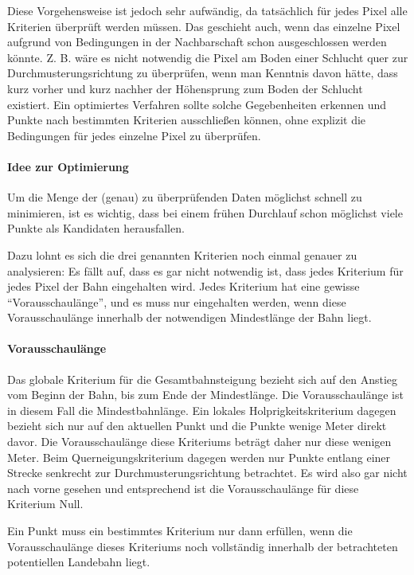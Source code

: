 \documentclass[
11pt, %
a4paper, %
oneside, %
pdfspacing, %
headinclude,
BCOR5mm, %
ngerman, %
bibtotocnumbered,
]{scrartcl}
\begin{document}
Diese Vorgehensweise ist jedoch sehr aufwändig, da tatsächlich für jedes Pixel alle Kriterien überprüft werden müssen. Das geschieht auch, wenn das einzelne Pixel aufgrund von Bedingungen in der Nachbarschaft schon ausgeschlossen werden könnte. Z. B. wäre es nicht notwendig die Pixel am Boden einer Schlucht quer zur Durchmusterungsrichtung zu überprüfen, wenn man Kenntnis davon hätte, dass kurz vorher und kurz nachher der Höhensprung zum Boden der Schlucht existiert. Ein optimiertes Verfahren sollte solche Gegebenheiten erkennen und Punkte nach bestimmten Kriterien ausschließen können, ohne explizit die Bedingungen für jedes einzelne Pixel zu überprüfen.




\paragraph{Idee zur Optimierung}
Um die Menge der (genau) zu überprüfenden Daten möglichst schnell zu minimieren, ist es wichtig, dass bei einem frühen Durchlauf schon möglichst viele Punkte als Kandidaten herausfallen.

Dazu lohnt es sich die drei genannten Kriterien noch einmal genauer zu analysieren: Es fällt auf, dass es gar nicht notwendig ist, dass jedes Kriterium für jedes Pixel der Bahn eingehalten wird. Jedes Kriterium hat eine gewisse "`Vorausschaulänge"', und es muss nur eingehalten werden, wenn diese Vorausschaulänge innerhalb der notwendigen Mindestlänge der Bahn liegt.

\paragraph{Vorausschaulänge} Das globale Kriterium für die Gesamtbahnsteigung bezieht sich auf den Anstieg vom Beginn der Bahn, bis zum Ende der Mindestlänge. Die Vorausschaulänge ist in diesem Fall die Mindestbahnlänge. Ein lokales Holprigkeitskriterium dagegen bezieht sich nur auf den aktuellen Punkt und die Punkte wenige Meter direkt davor. Die Vorausschaulänge diese Kriteriums beträgt daher nur diese wenigen Meter. Beim Querneigungskriterium dagegen werden nur Punkte entlang einer Strecke senkrecht zur Durchmusterungsrichtung betrachtet. Es wird also gar nicht nach vorne gesehen und entsprechend ist die Vorausschaulänge für diese Kriterium Null.

Ein Punkt muss ein bestimmtes Kriterium nur dann erfüllen, wenn die Vorausschaulänge dieses Kriteriums noch vollständig innerhalb der betrachteten potentiellen Landebahn liegt. 
\end{document}
